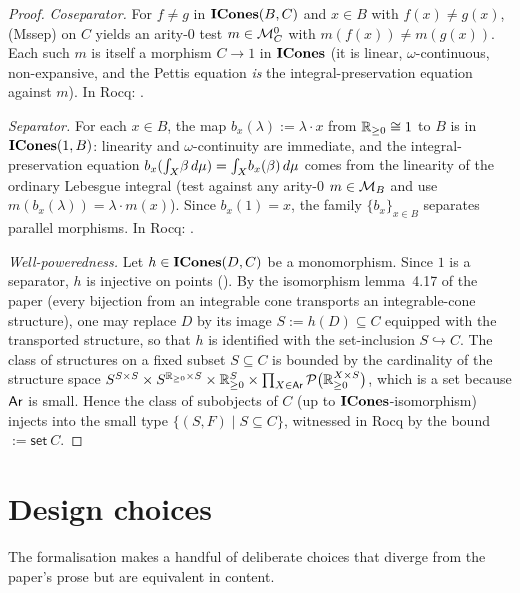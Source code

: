\begin{proof}
\emph{Coseparator.} For $f \neq g$ in $\mathbf{ICones}(B, C)$ and $x \in B$
with $f(x) \neq g(x)$, (Mssep) on $C$ yields an arity-$0$ test
$m \in \mathcal{M}^0_C$ with $m(f(x)) \neq m(g(x))$. Each such $m$ is
itself a morphism $C \to 1$ in $\mathbf{ICones}$ (it is linear,
$\omega$-continuous, non-expansive, and the Pettis equation
\emph{is} the integral-preservation equation against $m$). In Rocq:
.

\emph{Separator.} For each $x \in B$, the map $b_x(\lambda) := \lambda
\cdot x$ from $\mathbb{R}_{\geq 0} \cong 1$ to $B$ is in $\mathbf{ICones}(1, B)$:
linearity and $\omega$-continuity are immediate, and the
integral-preservation equation $b_x(\int_{X}\!\beta\,d\mu) =
\int_{X}\!b_x(\beta)\,d\mu$ comes from the linearity of the
ordinary Lebesgue integral (test against any arity-$0$
$m \in \mathcal{M}_B$ and use $m(b_x(\lambda)) = \lambda \cdot m(x)$).
Since $b_x(1) = x$, the family $\{b_x\}_{x \in B}$ separates parallel
morphisms. In Rocq:
.

\emph{Well-poweredness.} Let $h \in \mathbf{ICones}(D, C)$ be a monomorphism.
Since $1$ is a separator, $h$ is injective on points
(). By the
isomorphism lemma~4.17 of the paper (every bijection from an
integrable cone transports an integrable-cone structure), one may
replace $D$ by its image $S := h(D) \subseteq C$ equipped with the
transported structure, so that $h$ is identified with the set-inclusion
$S \hookrightarrow C$. The class of structures on a fixed subset
$S \subseteq C$ is bounded by the cardinality of the structure
space
$S^{S \times S} \times S^{\mathbb{R}_{\geq 0} \times S} \times \mathbb{R}_{\geq 0}^S
\times \prod_{X \in \mathsf{Ar}} \mathcal{P}\bigl(\mathbb{R}_{\geq 0}^{X \times S}\bigr)$,
which is a set because $\mathsf{Ar}$ is small. Hence the class of
subobjects of $C$ (up to $\mathbf{ICones}$-isomorphism) injects into the
small type
$\{(S, F) \mid S \subseteq C\}$, witnessed in Rocq by the bound
 $:= \mathsf{set}\ C$.
\end{proof}

\section{Design choices}\label{sec:design-choices}

The formalisation makes a handful of deliberate choices that
diverge from the paper's prose but are equivalent in content.

